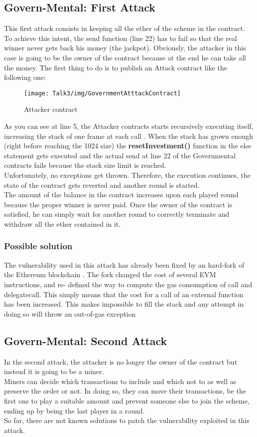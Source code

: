 \subsection{Govern-Mental: First Attack}
This first attack consists in keeping all the ether of the scheme in the contract. To achieve this intent, the send function (line 22) has to fail so that the real winner never gets back his money (the jackpot).
Obviously, the attacker in this case is going to be the owner of the contract because at the end he can take all the money.
The first thing to do is to publish an Attack contract like the following one:
\begin{figure}[H]
\begin{center}
\texttt{[image: Talk3/img/GovernmentAtttackContract]}
\end{center}
\caption{Attacker contract}
\label{label}
\end{figure}
As you can see at line 5, the Attacker contracts starts recursively executing itself, increasing the stack of one frame at each call \cite{paper2}.
When the stack has grown enough (right before reaching the 1024 size) the \textbf{resetInvestment()} function in the else statement gets executed and the actual send at line 22 of the Governmental contracts fails because the stack size limit is reached.\\
Unfortunately, no exceptions get thrown. Therefore, the execution continues, the state of the contract gets reverted and another round is started.\\
The amount of the balance in the contract increases upon each played round because the proper winner is never paid. Once the owner of the contract is satisfied, he can simply wait for another round to correctly terminate and withdraw all the ether contained in it.
\subsubsection{Possible solution}
The vulnerability used in this attack has already been fixed by an hard-fork of the Ethereum blockchain \cite{hardfork}. The fork changed the cost of several EVM instructions, and re- defined the way to compute the gas consumption of call and delegatecall\cite{paper2}.
This simply means that the cost for a call of an external function has been increased. This makes impossible to fill the stack and any attempt in doing so will throw an out-of-gas exception
\subsection{Govern-Mental: Second Attack}
In the second attack, the attacker is no longer the owner of the contract but instead it is going to be a miner.\\
Miners can decide which transactions to include and which not to as well as preserve the order or not\cite{paper2}. In doing so, they can move their transactions, be the first one to play a suitable amount and prevent someone else to join the scheme, ending up by being the last player in a round.\\
So far, there are not known solutions to patch the vulnerability exploited in this attack.



